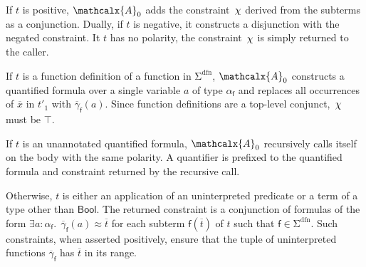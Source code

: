 \documentclass[runningheads,a4paper]{llncs}
\newcommand{\con}[1]{\mathsf{#1}}
\renewcommand\vec[1]{\overline{#1}}
\let\oldchi=\chi
\def\chi{{\vthinspace\oldchi}}
\let\oldSigma=\Sigma
\def\Sigma{\mathrm{\oldSigma}}
\newcommand{\teq}{\approx}
\newcommand{\conv}{\mathcalx{A}}
\newcommand{\sfundefs}[1]{#1^\mathrm{dfn}}
\newcommand\ty[1]{\con{#1}}
\newcommand{\Bool}{\ty{Bool}}
\newcommand{\ltrue}{\top}
\newcommand\concret{\gamma} %
\newcommand{\vecfarg}[1]{\vec{\concret}_{#1}}
\newcommand{\fargtype}[1]{\alpha_{#1}}
\newcommand{\vthinspace}{\kern+0.083333em}
\begin{document}
If $t$ is positive, $\conv_0$ adds the constraint $\chi$ derived from
the subterms as a conjunction. Dually, if $t$ is negative, it constructs a
disjunction with the negated constraint. It $t$ has no polarity, the
constraint $\chi$ is simply returned to the caller.

If $t$ is a function definition of a function in
$\sfundefs{\Sigma}$, $\conv_0$ constructs a quantified formula over a single variable
$a$ of type $\fargtype{\con{f}}$ and replaces all occurrences of $\vec x$ in
$t'_1$ with $\vecfarg{\con{f}}( a )$. Since function definitions
are a top-level conjunct, %
$\chi$ must be $\ltrue$.

If $t$ is an unannotated quantified formula, $\conv_0$ recursively calls itself
on the body with the same polarity. A quantifier is prefixed to the
quantified formula and constraint returned by the recursive call.

Otherwise, $t$ is either an application of an uninterpreted predicate or a term
of a type other than $\Bool$. The returned constraint is a conjunction of
formulas of the form $\exists a : {\fargtype{\con{f}}}.\;\, \vecfarg{\con{f}}(
a ) \teq \vec t$ for each subterm $\con{f}( \vec t )$ of $t$ such that $\con{f}
\in \sfundefs{\Sigma}$. Such constraints, when asserted positively, ensure that
the tuple of uninterpreted functions $\vecfarg{\con{f}}$ has $\vec t$
in its range.

\end{document}
